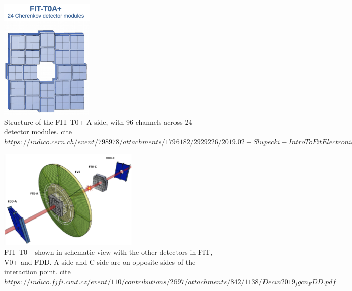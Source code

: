 \begin{figure}[H]
    \centering
    \includegraphics[width=0.4\textwidth]{figures/FIT/FT0A_Structure.png}
    \caption{Structure of the FIT T0+ A-side, with 96 channels across 24 detector modules. cite $https://indico.cern.ch/event/798978/attachments/1796182/2929226/2019.02-Slupecki-IntroToFitElectronics.pdf$}
    \label{fig:my_label}
\end{figure}

\begin{figure}[H]
    \centering
    \includegraphics[width=0.6\textwidth]{figures/FIT/FIT_Layout.png}
    \caption{FIT T0+ shown in schematic view with the other detectors in FIT, V0+ and FDD. A-side and C-side are on opposite sides of the interaction point. cite $https://indico.fjfi.cvut.cz/event/110/contributions/2697/attachments/842/1138/Decin2019_jgcn_FDD.pdf$}
    \label{fig:FIT_Layout}
\end{figure}


